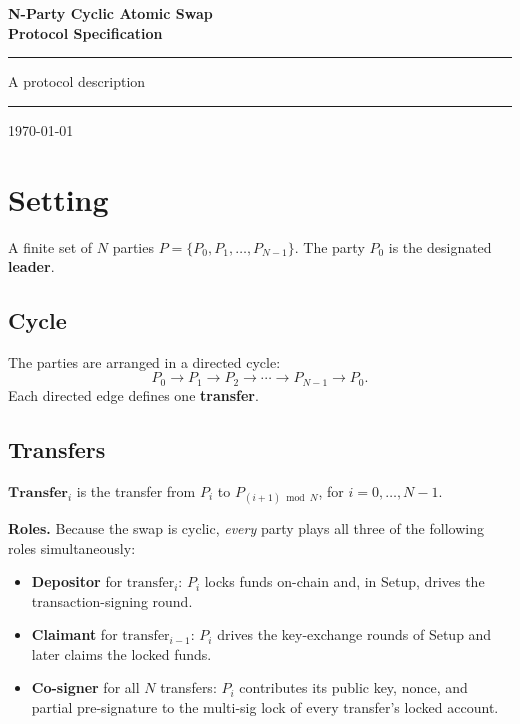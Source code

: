 \documentclass[11pt,a4paper,dvipsnames]{article}
\begin{document}
\begin{titlepage}
\centering
\vspace*{2.5cm}
{\huge\bfseries\color{protoblue}
  N-Party Cyclic Atomic Swap\\[0.4em]
  Protocol Specification\par}
\vspace{1.2cm}
\color{rulecolor}\rule{0.8\textwidth}{1.2pt}

\vspace{0.8cm}
{\large\color{black}
  A protocol description\par}
\vspace{0.5cm}
\color{rulecolor}\rule{0.8\textwidth}{0.4pt}
\vfill
{\normalsize\color{gray}\today}
\end{titlepage}

\tableofcontents
\newpage

\section{Setting}

A finite set of $N$ parties $P = \{P_0, P_1, \ldots, P_{N-1}\}$.
The party $P_0$ is the designated \textbf{leader}.

\subsection{Cycle}

The parties are arranged in a directed cycle:
\[
  P_0 \to P_1 \to P_2 \to \cdots \to P_{N-1} \to P_0.
\]
Each directed edge defines one \textbf{transfer}.

\subsection{Transfers}

$\mathbf{Transfer}_i$ is the transfer from $P_i$ to $P_{(i+1)\bmod N}$,
for $i = 0, \ldots, N-1$.

\medskip\noindent\textbf{Roles.}\;
Because the swap is cyclic, \emph{every} party plays all three of the
following roles simultaneously:

\begin{itemize}
  \item \textbf{Depositor} for $\mathrm{transfer}_i$: $P_i$ locks funds
    on-chain and, in Setup, drives the transaction-signing round.
  \item \textbf{Claimant} for $\mathrm{transfer}_{i-1}$: $P_i$ drives the
    key-exchange rounds of Setup and later claims the locked funds.
  \item \textbf{Co-signer} for all $N$ transfers: $P_i$ contributes its
    public key, nonce, and partial pre-signature to the multi-sig lock of
    every transfer's locked account.
\end{itemize}
\end{document}
